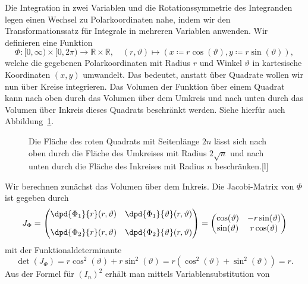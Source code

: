 \documentclass{scrartcl}
\newcommand{\R}{\mathbb{R}}
\begin{document}
Die Integration in zwei Variablen und die Rotationssymmetrie des Integranden legen einen 
Wechsel zu Polarkoordinaten nahe, indem wir den Transformationssatz für Integrale in mehreren 
Variablen anwenden. Wir definieren eine Funktion
\[
  \Phi \colon [0, \infty) \times [0, 2\pi) \rightarrow \R \times \R, \quad
  (r, \vartheta) \mapsto (x \coloneqq r \cos(\vartheta), y \coloneqq r \sin(\vartheta)),
\]
welche die gegebenen Polarkoordinaten mit Radius $ r $ und Winkel $ \vartheta $ in kartesische 
Koordinaten $ (x, y) $ umwandelt. Das bedeutet, anstatt über Quadrate wollen wir nun über Kreise 
integrieren. Das Volumen der Funktion über einem Quadrat kann nach oben durch das Volumen über dem 
Umkreis und nach unten durch das Volumen über Inkreis dieses Quadrats beschränkt werden. Siehe 
hierfür auch Abbildung~\ref{fig:square}.
\begin{figure}[ht]
\begin{captionbeside}{Die Fläche des roten Quadrats mit Seitenlänge $ 2n $ lässt sich nach oben 
durch die Fläche des Umkreises mit Radius $ 2\sqrt{n} $ und nach unten durch die Fläche des 
Inkreises mit Radius $ n $ beschränken.}[l]
\end{captionbeside}
\label{fig:square}
\end{figure}
Wir berechnen zunächst das Volumen über dem Inkreis. Die Jacobi-Matrix von $ \Phi $ ist gegeben 
durch
\[
  J_{\Phi} = \begin{pmatrix}
    \dpd{\Phi_{1}}{r}(r, \vartheta) & \dpd{\Phi_{1}}{\vartheta}(r, \vartheta) \\[1em]
    \dpd{\Phi_{2}}{r}(r, \vartheta) & \dpd{\Phi_{2}}{\vartheta}(r, \vartheta)
  \end{pmatrix}
  = \begin{pmatrix}
    \cos(\vartheta) & -r \sin(\vartheta) \\
    \sin(\vartheta) &  r \cos(\vartheta)
  \end{pmatrix}
\]
mit der Funktionaldeterminante
\[
    \det(J_{\Phi})
  = r \cos^{2}(\vartheta) + r \sin^{2}(\vartheta)
  = r (\cos^{2}(\vartheta) + \sin^{2}(\vartheta))
  = r.
\]
Aus der Formel für $ (I_{n})^{2} $ erhält man mittels Variablensubstitution von
\end{document}
